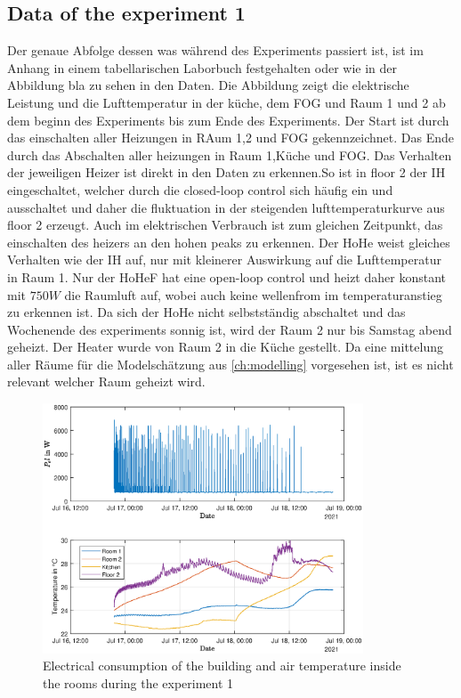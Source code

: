 \subsection{Data of the experiment 1}
\label{subsec:Data of the experiment 1}
Der genaue Abfolge dessen was während des Experiments passiert ist, ist im Anhang in einem tabellarischen Laborbuch festgehalten oder wie in der Abbildung bla zu sehen in den Daten. Die Abbildung zeigt die elektrische Leistung und die Lufttemperatur in der küche, dem FOG und Raum 1 und 2 ab dem beginn des Experiments bis zum Ende des Experiments. Der Start ist durch das einschalten aller Heizungen in RAum 1,2 und FOG gekennzeichnet. Das Ende durch das Abschalten aller heizungen in Raum 1,Küche und FOG.
Das Verhalten der jeweiligen Heizer ist direkt in den Daten zu erkennen.So ist in floor 2 der IH eingeschaltet, welcher durch die closed-loop control sich häufig ein und ausschaltet und daher die fluktuation in der steigenden lufttemperaturkurve aus floor 2 erzeugt. Auch im elektrischen Verbrauch ist zum gleichen Zeitpunkt, das einschalten des heizers an den hohen peaks zu erkennen. Der HoHe weist gleiches Verhalten wie der IH auf, nur mit kleinerer Auswirkung auf die Lufttemperatur in Raum 1. Nur der HoHeF hat eine open-loop control und heizt daher konstant mit $750 W$ die Raumluft auf, wobei auch keine wellenfrom im temperaturanstieg zu erkennen ist. Da sich der HoHe nicht selbstständig abschaltet und das Wochenende des experiments sonnig ist, wird der Raum 2 nur bis Samstag abend geheizt. Der Heater wurde von Raum 2 in die Küche gestellt. Da eine mittelung aller Räume für die Modelschätzung aus \autoref{ch:modelling} vorgesehen ist, ist es nicht relevant welcher Raum geheizt wird.
\begin{figure}
            \centering
            \includegraphics[width=0.85\textwidth]{figure/P_el_trainingsdaten_latex.eps}
           \caption{Electrical consumption of the building and air temperature inside the rooms during the experiment 1}
           \label{fig:P_elTemperatureExperiment1}
    \end{figure}
